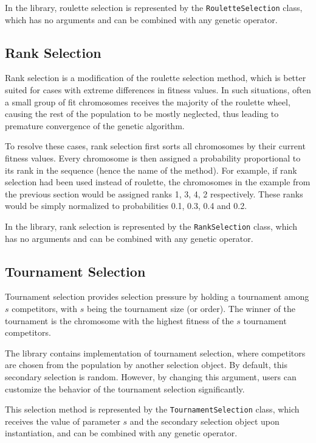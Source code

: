 In the library, roulette selection is represented by the \texttt{RouletteSelection} class, which has no arguments and can be combined with any genetic operator.

\subsection{Rank Selection}
Rank selection is a modification of the roulette selection method, which is better suited for cases with extreme differences in fitness values. In such situations, often a small group of fit chromosomes receives the majority of the roulette wheel, causing the rest of the population to be mostly neglected, thus leading to premature convergence of the genetic algorithm.

To resolve these cases, rank selection first sorts all chromosomes by their current fitness values. Every chromosome is then assigned a probability proportional to its rank in the sequence (hence the name of the method). For example, if rank selection had been used instead of roulette, the chromosomes in the example from the previous section would be assigned ranks 1, 3, 4, 2 respectively. These ranks would be simply normalized to probabilities 0.1, 0.3, 0.4 and 0.2.

In the library, rank selection is represented by the \texttt{RankSelection} class, which has no arguments and can be combined with any genetic operator.

\subsection{Tournament Selection}
Tournament selection provides selection pressure by holding a tournament among $s$ competitors, with $s$ being the tournament size (or order). The winner of the tournament is the chromosome with the highest fitness of the $s$ tournament competitors. \cite{GaTournamentSelection}

The library contains implementation of tournament selection, where competitors are chosen from the population by another selection object. By default, this secondary selection is random. However, by changing this argument, users can customize the behavior of the tournament selection significantly.

This selection method is represented by the \texttt{TournamentSelection} class, which receives the value of parameter $s$ and the secondary selection object upon instantiation, and can be combined with any genetic operator.

